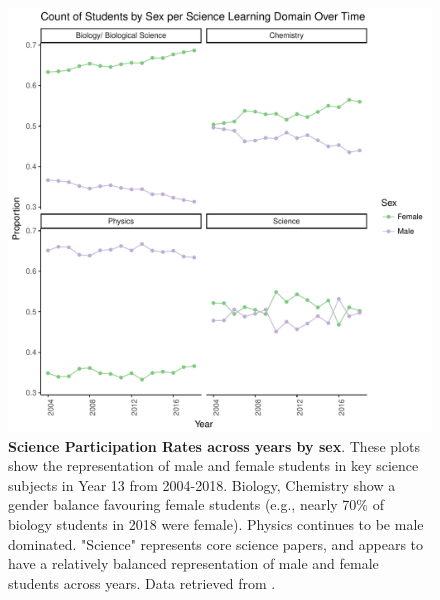 \documentclass[a4paper]{article}
\begin{document}
\begin{figure}
    \centering
    \includegraphics{STEM_Participation_Y13_Proportion_Science_Sex.pdf}
    \caption{\textbf{Science Participation Rates across years by sex}. These plots show the representation of male and female students in key science subjects in Year 13 from 2004-2018. Biology, Chemistry show a gender balance favouring female students (e.g., nearly 70\% of biology students in 2018 were female). Physics continues to be male dominated. "Science" represents core science papers, and appears to have a relatively balanced representation of male and female students across years. Data retrieved from \cite{EducationCounts_2018}.}
    \label{fig:STEM_Participation_Sex}
\end{figure}
\end{document}
